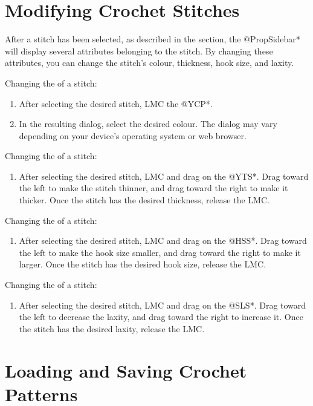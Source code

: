 \documentclass[main.tex]{subfiles}
\begin{document}
\section{Modifying Crochet Stitches}

After a stitch has been selected, as described in the  section, the @PropSidebar* will display several attributes belonging to the stitch. By changing these attributes, you can change the stitch's colour, thickness, hook size, and laxity.

Changing the  of a stitch:
\begin{enumerate}
\item After selecting the desired stitch, LMC the @YCP*.
\item In the resulting dialog, select the desired colour. The dialog may vary depending on your device's operating system or web browser.
\end{enumerate}

Changing the  of a stitch:
\begin{enumerate}
\item After selecting the desired stitch, LMC and drag on the @YTS*. Drag toward the left to make the stitch thinner, and drag toward the right to make it thicker. Once the stitch has the desired thickness, release the LMC.
\end{enumerate}

Changing the  of a stitch:
\begin{enumerate}
\item After selecting the desired stitch, LMC and drag on the @HSS*. Drag toward the left to make the hook size smaller, and drag toward the right to make it larger. Once the stitch has the desired hook size, release the LMC.
\end{enumerate}

Changing the  of a stitch:
\begin{enumerate}
\item After selecting the desired stitch, LMC and drag on the @SLS*. Drag toward the left to decrease the laxity, and drag toward the right to increase it. Once the stitch has the desired laxity, release the LMC.
\end{enumerate}

\section{Loading and Saving Crochet Patterns}
\end{document}
